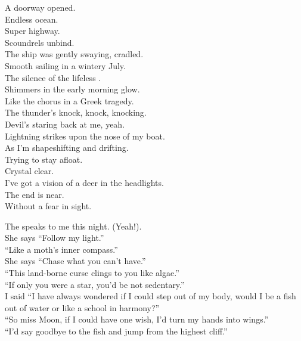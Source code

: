 



A doorway opened. \\
Endless ocean. \\
Super highway. \\
Scoundrels unbind. \\
The ship was gently swaying, cradled. \\
Smooth sailing in a wintery July. \\
The silence of the lifeless . \\
Shimmers in the early morning glow. \\
Like the chorus in a Greek tragedy. \\
The thunder's knock, knock, knocking. \\
Devil's staring back at me, yeah. \\

Lightning strikes upon the nose of my boat. \\
As I'm shapeshifting and drifting. \\
Trying to stay afloat. \\
Crystal clear. \\
I've got a vision of a deer in the headlights. \\
The end is near. \\
Without a fear in sight. \\


The  speaks to me this night. (Yeah!). \\
She says ``Follow my light.'' \\
``Like a moth's inner compass.'' \\
She says ``Chase what you can't have.'' \\
``This land-borne curse clings to you like algae.'' \\
``If only you were a star, you'd be not sedentary.'' \\
I said ``I have always wondered if I could step out of my body, would I be a fish out of water or like a school in harmony?'' \\
``So miss Moon, if I could have one wish, I'd turn my hands into wings.'' \\
``I'd say goodbye to the fish and jump from the highest cliff.'' \\

